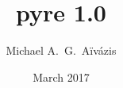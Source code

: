 %
%

\title[pyre 1.0 -- March-April 2017]{pyre 1.0}
\author[\url{michael.aivazis@para-sim.com}]{Michael A.~G.~A\"iv\'azis}
\date{March 2017}


